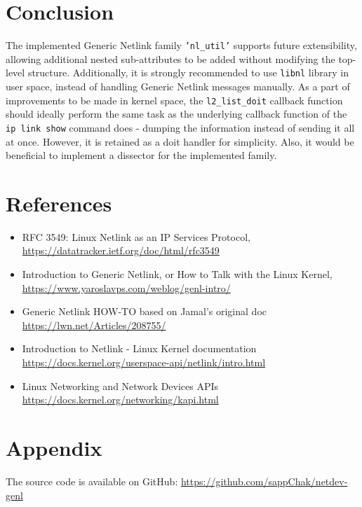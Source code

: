 \documentclass[10pt, letterpaper]{article}
\begin{document}
\section{Conclusion}
The implemented Generic Netlink family \texttt{'nl\_util'} supports future extensibility,
allowing additional nested sub-attributes to be added without modifying the top-level
structure. Additionally, it is strongly recommended to use \texttt{libnl} library in user
space, instead of handling Generic Netlink messages manually. As a part of improvements to
be made in kernel space, the \texttt{l2\_list\_doit} callback function should ideally
perform the same task as the underlying callback function of the \texttt{ip link show}
command does - dumping the information instead of sending it all at once. However, it is
retained as a doit handler for simplicity. Also, it would be beneficial to implement a
dissector for the implemented family.

\section{References}
\begin{itemize}
	\item RFC 3549: Linux Netlink as an IP Services Protocol, \url{https://datatracker.ietf.org/doc/html/rfc3549}
	\item Introduction to Generic Netlink, or How to Talk with the Linux Kernel, \url{https://www.yaroslavps.com/weblog/genl-intro/}
	\item Generic Netlink HOW-TO based on Jamal's original doc \url{https://lwn.net/Articles/208755/}
	\item Introduction to Netlink - Linux Kernel documentation \url{https://docs.kernel.org/userspace-api/netlink/intro.html}
	\item Linux Networking and Network Devices APIs \url{https://docs.kernel.org/networking/kapi.html}
\end{itemize}

\section*{Appendix}
The source code is available on GitHub: \url{https://github.com/sappChak/netdev-genl}
\end{document}
